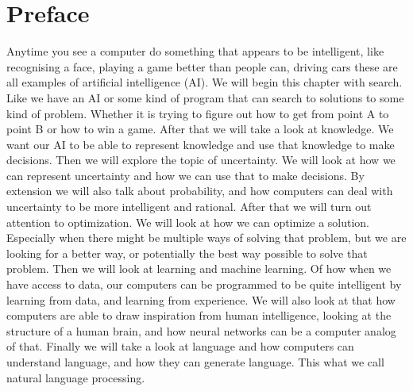 \section{Preface}
Anytime you see a computer do something that appears to be intelligent, like recognising a face, playing a game better than people can, driving cars these are all examples of artificial intelligence (AI). 
We will begin this chapter with search. Like we have an AI or some kind of program that can search to solutions to some kind of problem. Whether it is trying to figure out how to get from point A to point B or how to win a game.
After that we will take a look at knowledge. We want our AI to be able to represent knowledge and use that knowledge to make decisions. 
Then we will explore the topic of uncertainty. We will look at how we can represent uncertainty and how we can use that to make decisions. By extension we will also talk about probability, and how computers can deal with uncertainty to be more intelligent and rational.
After that we will turn out attention to optimization. We will look at how we can optimize a solution. Especially when there might be multiple ways of solving that problem, but we are looking for a better way, or potentially the best way possible to solve that problem.
Then we will look at learning and machine learning. Of how when we have access to data, our computers can be programmed to be quite intelligent by learning from data, and learning from experience.
We will also look at that how computers are able to draw inspiration from human intelligence, looking at the structure of a human brain, and how neural networks can be a computer analog of that.
Finally we will take a look at language and how computers can understand language, and how they can generate language. This what we call natural language processing.